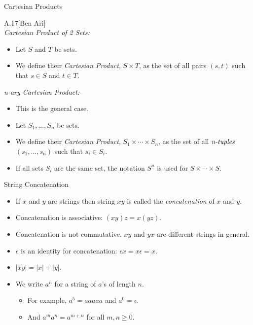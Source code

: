 \begin{slide}[bm=,toc=]{Cartesian Products}
\begin{defn}{A.17}[Ben Ari]
~\\
\emph{Cartesian Product of 2 Sets:}
\begin{itemize}
\item Let $S$ and $T$ be sets.
\item We define their \emph{Cartesian Product}, $S \times T$, as the set of all
pairs $(s,t)$ such that $s \in S$ and $t \in T$.
\end{itemize}
\emph{n-ary Cartesian Product:}
\begin{itemize}
\item This is the general case.
\item Let $S_1,...,S_n$ be sets.
\item We define their \emph{Cartesian Product}, $S_1 \times \cdots \times S_n$, as the set of all
$\emph{n-tuples}$ $(s_1,...,s_n)$ such that $s_i \in S_i$.
\item If all sets $S_i$ are the same set, the notation $S^n$ is used for $S
\times \cdots \times S$.
\end{itemize}
\end{defn}
\end{slide}

\begin{slide}[bm=,toc=]{String Concatenation}

\begin{itemize}
    \item If $x$ and $y$ are strings then string $xy$ is called the
    \emph{concatenation} of $x$ and $y$.
    \item Concatenation is associative: $(xy)z = x(yz)$. 
    \item Concatenation is not commutative. $xy$ and $yx$ are different strings
    in general.
    \item $\epsilon$ is an identity for concatenation: ${\epsilon}x = x\epsilon = x$. 
    \item $|xy| = |x| + |y|$. 
    \item We write $a^n$ for a string of $a$'s of length $n$.
    \begin{itemize}
        \item For example, $a^5 = aaaaa$ and $a^0 = \epsilon$. 
        \item And $a^ma^n = a^{m+n}$ for all $m,n \geq 0.$
    \end{itemize} 
\end{itemize} 
\end{slide}

